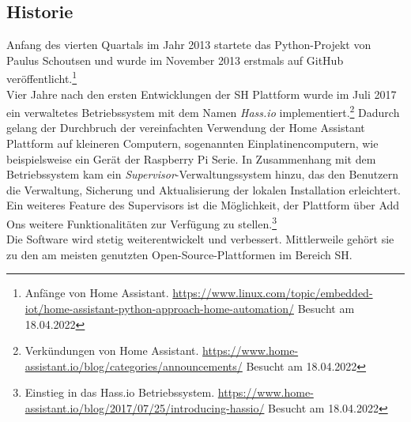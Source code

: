     \subsection*{Historie}
    \label{sec:historyHOAS}
        Anfang des vierten Quartals im Jahr 2013 startete das Python-Projekt von Paulus Schoutsen und wurde im November 2013 erstmals auf GitHub 
        veröffentlicht.\footnote{Anfänge von Home Assistant. \url{https://www.linux.com/topic/embedded-iot/home-assistant-python-approach-home-automation/} Besucht am 18.04.2022}
        \\
        \linebreak
        Vier Jahre nach den ersten Entwicklungen der \acl{SH} Plattform wurde im Juli 2017 ein verwaltetes Betriebssystem mit dem Namen 
        \textit{Hass.io} implementiert.\footnote{Verkündungen von Home Assistant. \url{https://www.home-assistant.io/blog/categories/announcements/} Besucht am 18.04.2022} 
        Dadurch gelang der Durchbruch der vereinfachten Verwendung der Home Assistant Plattform auf kleineren Computern, sogenannten 
        Einplatinencomputern, wie beispielsweise ein Gerät der Raspberry Pi Serie. In Zusammenhang mit dem Betriebssystem kam ein 
        \textit{Supervisor}-Verwaltungssystem hinzu, das den Benutzern die Verwaltung, Sicherung und Aktualisierung der lokalen Installation 
        erleichtert. Ein weiteres Feature des Supervisors ist die Möglichkeit, der Plattform über Add Ons weitere Funktionalitäten zur Verfügung zu 
        stellen.\footnote{Einstieg in das Hass.io Betriebssystem. \url{https://www.home-assistant.io/blog/2017/07/25/introducing-hassio/} Besucht am 18.04.2022}
        \\
        \linebreak
        Die Software wird stetig weiterentwickelt und verbessert. Mittlerweile gehört sie zu den am meisten genutzten Open-Source-Plattformen 
        im Bereich \acl{SH}.

